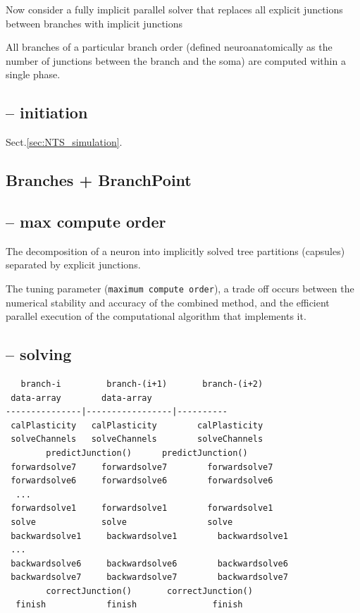  Now consider a fully implicit parallel solver that replaces all explicit
junctions between branches with implicit junctions 

All branches of a particular branch order (defined neuroanatomically as the
number of junctions between the branch and the soma) are computed within a
single phase.

\subsection{-- initiation}

Sect.\ref{sec:NTS_simulation}.

\subsection{Branches + BranchPoint}



\subsection{-- max compute order}
\label{sec:kozloski2011-capsule}

The decomposition of a neuron into implicitly solved tree partitions
(capsules) separated by explicit junctions. 

The tuning parameter (\verb!maximum compute order!), a trade off occurs between
the numerical stability and accuracy of the combined method, and the efficient
parallel execution of the computational algorithm that implements it.

\subsection{-- solving}



\begin{verbatim}
   branch-i         branch-(i+1)       branch-(i+2)
 data-array        data-array
---------------|-----------------|----------
 calPlasticity   calPlasticity        calPlasticity
 solveChannels   solveChannels        solveChannels
        predictJunction()      predictJunction()
 forwardsolve7     forwardsolve7        forwardsolve7
 forwardsolve6     forwardsolve6        forwardsolve6
  ...
 forwardsolve1     forwardsolve1        forwardsolve1 
 solve             solve                solve 
 backwardsolve1     backwardsolve1        backwardsolve1
 ...
 backwardsolve6     backwardsolve6        backwardsolve6
 backwardsolve7     backwardsolve7        backwardsolve7 
        correctJunction()       correctJunction()
  finish            finish               finish
\end{verbatim}


